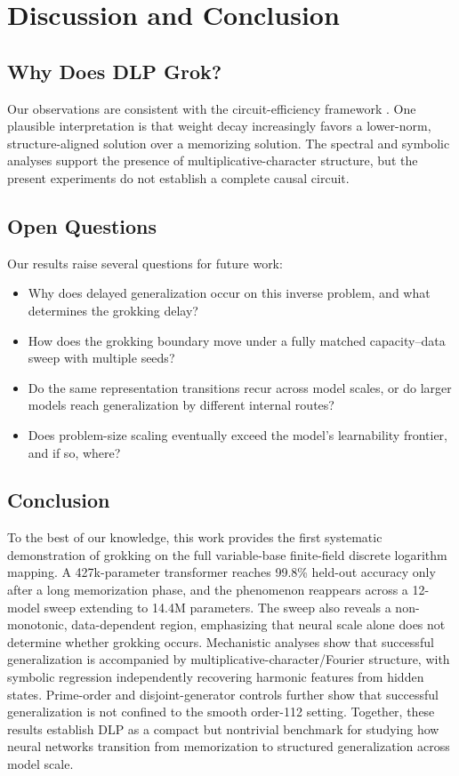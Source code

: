 \documentclass[11pt]{article}
\begin{document}
\FloatBarrier
\section{Discussion and Conclusion}
\label{sec:discussion}

\subsection{Why Does DLP Grok?}

Our observations are consistent with the circuit-efficiency framework \citep{varma2023explaining}. One plausible interpretation is that weight decay increasingly favors a lower-norm, structure-aligned solution over a memorizing solution. The spectral and symbolic analyses support the presence of multiplicative-character structure, but the present experiments do not establish a complete causal circuit.

\subsection{Open Questions}

Our results raise several questions for future work:
\begin{itemize}[leftmargin=*]
    \item Why does delayed generalization occur on this inverse problem, and what determines the grokking delay?
    \item How does the grokking boundary move under a fully matched capacity--data sweep with multiple seeds?
    \item Do the same representation transitions recur across model scales, or do larger models reach generalization by different internal routes?
    \item Does problem-size scaling eventually exceed the model's learnability frontier, and if so, where?
\end{itemize}

\subsection{Conclusion}

To the best of our knowledge, this work provides the first systematic demonstration of grokking on the full variable-base finite-field discrete logarithm mapping. A 427k-parameter transformer reaches 99.8\% held-out accuracy only after a long memorization phase, and the phenomenon reappears across a 12-model sweep extending to 14.4M parameters. The sweep also reveals a non-monotonic, data-dependent region, emphasizing that neural scale alone does not determine whether grokking occurs. Mechanistic analyses show that successful generalization is accompanied by multiplicative-character/Fourier structure, with symbolic regression independently recovering harmonic features from hidden states. Prime-order and disjoint-generator controls further show that successful generalization is not confined to the smooth order-112 setting. Together, these results establish DLP as a compact but nontrivial benchmark for studying how neural networks transition from memorization to structured generalization across model scale.
\end{document}

